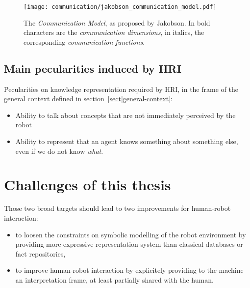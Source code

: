 \begin{figure}%
\centering
  \texttt{[image: communication/jakobson\_communication\_model.pdf]}
  \caption{The \emph{Communication Model}, as proposed by Jakobson. In bold
  characters are the \emph{communication dimensions}, in italics, the
  corresponding \emph{communication functions}.}
  \label{fig|jakobson_communication_model}
\end{figure}

\subsection{Main pecularities induced by HRI}
\label{sect|pecularities-krs-for-hri}

Pecularities on knowledge representation required by HRI, in the frame of the
general context defined in section~\ref{sect|general-context}:

\begin{itemize}

	\item Ability to talk about concepts that are not immediately perceived by
	the robot

	\item {} Ability to represent that an agent knows something about
	something else, even if we do not know \emph{what}.

\end{itemize}

\section{Challenges of this thesis}
\label{sect|krs-challenges}

Those two broad targets should lead to two improvements for human-robot
interaction:


\begin{itemize}
	\item to loosen the constraints on symbolic modelling of the robot
	environment by providing more expressive representation system than
	classical databases or fact repositories,

	\item to improve human-robot interaction by explicitely providing to the
	machine an interpretation frame, at least partially shared with the human.

\end{itemize}

